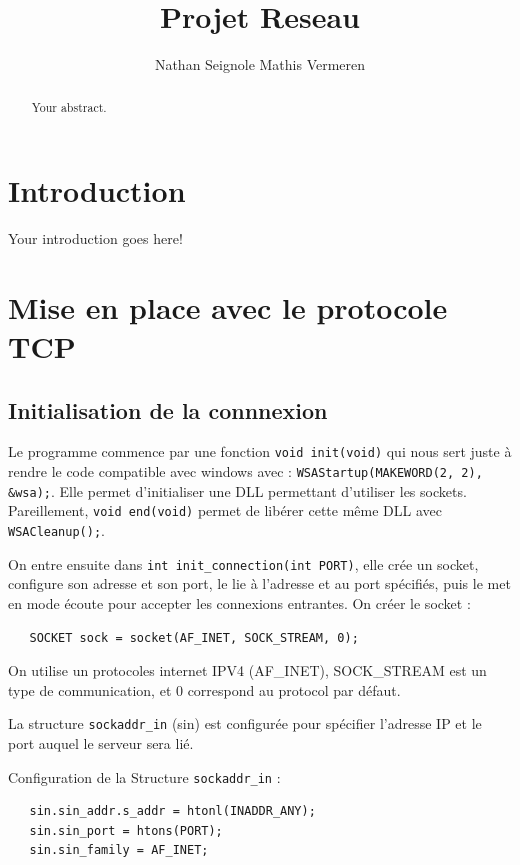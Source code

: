 \documentclass{article}
\title{Projet Reseau}
\author{Nathan Seignole Mathis Vermeren}
\begin{document}
\maketitle

\begin{abstract}
Your abstract.
\end{abstract}

\section{Introduction}

Your introduction goes here! 

\section{Mise en place avec le protocole TCP}

\subsection{Initialisation de la connnexion}
Le programme commence par une fonction \texttt{void init(void)} qui nous sert juste à rendre le code compatible avec windows avec : \texttt{WSAStartup(MAKEWORD(2, 2), &wsa);}. Elle permet d'initialiser une DLL permettant d'utiliser les sockets. Pareillement, \texttt{void end(void)} permet de libérer cette même DLL avec \texttt{WSACleanup();}.

On entre ensuite dans \texttt{int init_connection(int PORT)}, elle crée un socket, configure son adresse et son port, le lie à l'adresse et au port spécifiés, puis le met en mode écoute pour accepter les connexions entrantes.
On créer le socket : 

\begin{verbatim}
   SOCKET sock = socket(AF_INET, SOCK_STREAM, 0);
\end{verbatim}
On utilise un protocoles internet IPV4 (AF\_INET), SOCK\_STREAM est un type de communication, et 0 correspond au protocol par défaut. 

La structure \texttt{sockaddr_in} (sin) est configurée pour spécifier l'adresse IP et le port auquel le serveur sera lié.

Configuration de la Structure \texttt{sockaddr_in} :

\begin{verbatim}
   sin.sin_addr.s_addr = htonl(INADDR_ANY);
   sin.sin_port = htons(PORT);
   sin.sin_family = AF_INET;
\end{verbatim}
\end{document}
